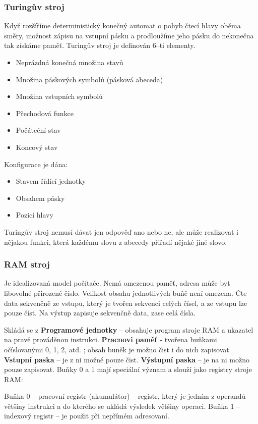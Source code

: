 \subsubsection{Turingův stroj}
Když rozšíříme deterministický konečný automat o pohyb čtecí hlavy oběma směry, možnost zápisu na vstupní pásku a prodloužíme jeho pásku do nekonečna tak získáme paměť. Turingův stroj je definován 6--ti elementy.
\begin{itemize}
\item Neprázdná konečná množina stavů
\item Množina páskových symbolů (pásková abeceda)
\item Množina vstupních symbolů
\item Přechodová funkce
\item Počáteční stav
\item Koncový stav
\end{itemize}
Konfigurace je dána:
\begin{itemize}
\item Stavem řídící jednotky
\item Obsahem pásky
\item Pozicí hlavy
\end{itemize}
Turingův stroj nemusí dávat jen odpověď ano nebo ne, ale může realizovat i nějakou funkci, která každému slovu z abecedy přiřadí nějaké jiné slovo.
\subsubsection{RAM stroj}
Je idealizovaná model počítače. Nemá omezenou paměť, adresa může byt libovolné přirozené číslo. Velikost obsahu jednotlivých buňě není omezena. Čte data
sekvenčně ze vstupu, který je tvořen sekvenci celých čísel, a ze vstupu lze pouze číst. Na výstup zapisuje sekvenčně data, zase celá čísla.

Skládá se z \textbf{Programové jednotky} -- obsahuje program stroje RAM a ukazatel na pravě prováděnou instrukci. \textbf{Pracnovi paměť} - tvořena buňkami očíslovanými 0, 1, 2, atd. ; obsah buněk je možno čist i do nich zapisovat \textbf{Vstupní paska} – je z ni možné pouze čist. \textbf{Výstupní paska} – je na ni možno pouze zapisovat. Buňky 0 a 1 mají speciální význam a slouží jako registry stroje RAM:


Buňka 0 – pracovní registr (akumulátor) – registr, který je jedním z operandů většiny instrukci a do kterého se ukládá výsledek většiny operaci.
Buňka 1 – indexový registr – je použit při nepřímém adresovaní.


